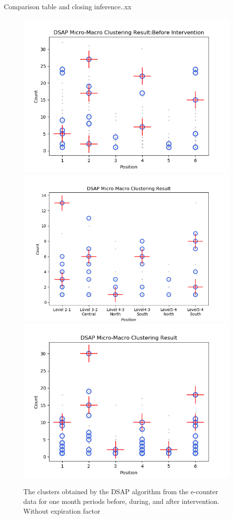 Comparison table and closing inference..xx
\begin{figure}[!h]
    \centering
    \includegraphics[width=.47\textwidth]{image/Chapters/Chapter6/DSAPBeforeMonthIntervention.png}
    \includegraphics[width=.51\textwidth]{image/Chapters/Chapter6/window10H.png}
    \includegraphics[width=.49\textwidth]{image/Chapters/Chapter6/DSAPAFTERmonthIntervention.png}
    \caption{The clusters obtained by the DSAP algorithm from the e-counter data for one month periods before, during, and after intervention. Without expiration factor}
    \label{dsap3mon}
\end{figure}






